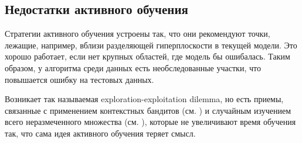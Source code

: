 \documentclass[specialist, 12pt, href]{article}
\begin{document}
\subsection{Недостатки активного
обучения}

Стратегии активного обучения устроены так, что они рекомендуют точки,
лежащие, например, вблизи разделяющей гиперплоскости в текущей модели.
Это хорошо работает, если нет крупных областей, где модель бы ошибалась.
Таким образом, у алгоритма среди данных есть необследованные участки,
что повышается ошибку на тестовых данных.

Возникает так называемая exploration-exploitation dilemma, но есть
приемы, связанные с применением контекстных бандитов (см. \cite{Bouneffouf1}) и случайным изучением всего неразмеченного множества (см.
\cite{Bouneffouf2}), которые не увеличивают время обучения так, что сама
идея активного обучения теряет смысл.



\end{document}

